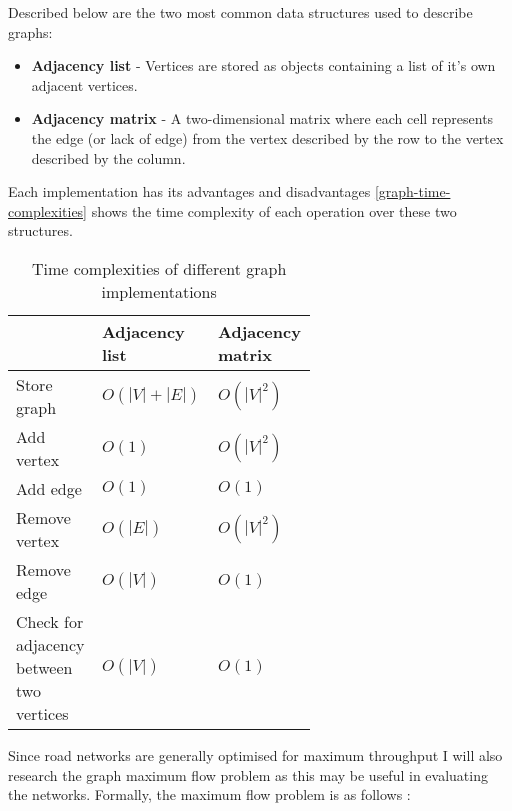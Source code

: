         Described below are the two most common data structures used to describe graphs:

        \begin{itemize}
            \item \textbf{Adjacency list} - Vertices are stored as objects containing a list of it's own adjacent vertices.
            \item \textbf{Adjacency matrix} - A two-dimensional matrix where each cell represents the edge (or lack of edge) from the vertex described by the row to the vertex described by the column.
        \end{itemize}

        Each implementation has its advantages and disadvantages \autoref{graph-time-complexities} shows the time complexity of each operation over these two structures.


        \begin{table}[h]
            \centering
            \begin{tabular}{|p{0.2\linewidth}|p{0.2\linewidth}|p{0.2\linewidth}|} \hline
            & Adjacency list & Adjacency matrix \\ \hline
            Store graph   & $O(|V|+|E|)$ & $O(|V|^2)$ \\ \hline
            Add vertex    & $O(1)$ & $O(|V|^2)$ \\ \hline
            Add edge      & $O(1)$ & $O(1)$ \\ \hline
            Remove vertex & $O(|E|)$ & $O(|V|^2)$ \\ \hline
            Remove edge   & $O(|V|)$ & $O(1)$ \\ \hline
            Check for adjacency between two vertices & $O(|V|)$ & $O(1)$ \\ \hline
            \end{tabular}
            \caption{Time complexities of different graph implementations \cite{graph-time-complexities}}
            \label{graph-time-complexities}
        \end{table}

        Since road networks are generally optimised for maximum throughput I will also research the graph maximum flow problem as this may be useful in evaluating the networks. Formally, the maximum flow problem is as follows \cite{citation needed}:

